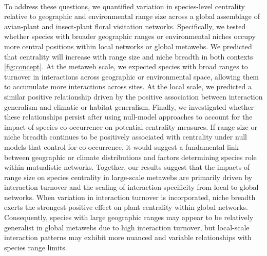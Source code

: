 \documentclass[12pt]{article}
\begin{document}
\paragraph*{}
To address these questions, we quantified variation in species-level centrality relative to geographic and environmental range size across a global assemblage of avian-plant and insect-plant floral visitation networks. Specifically, we tested whether species with broader geographic ranges or environmental niches occupy more central positions within local networks or global metawebs. We predicted that centrality will increase with range size and niche breadth in both contexts \ref{fig:concept}. At the metaweb scale, we expected species with broad ranges to turnover in interactions across geographic or environmental space, allowing them to accumulate more interactions across sites. At the local scale, we predicted a similar positive relationship driven by the positive association between interaction generalism and climatic or habitat generalism. Finally, we investigated whether these relationships persist after using null-model approaches to account for the impact of species co-occurrence on potential centrality measures. If range size or niche breadth continues to be positively associated with centrality under null models that control for co-occurrence, it would suggest a fundamental link between geographic or climate distributions and factors determining species role within mutualistic networks. Together, our results suggest that the impacts of range size on species centrality in large-scale metawebs are primarily driven by interaction turnover and the scaling of interaction specificity from local to global networks. When variation in interaction turnover is incorporated, niche breadth exerts the strongest positive effect on plant centrality within global networks. Consequently, species with large geographic ranges may appear to be relatively generalist in global metawebs due to high interaction turnover, but local-scale interaction patterns may exhibit more nuanced and variable relationships with species range limits. 


\end{document}
